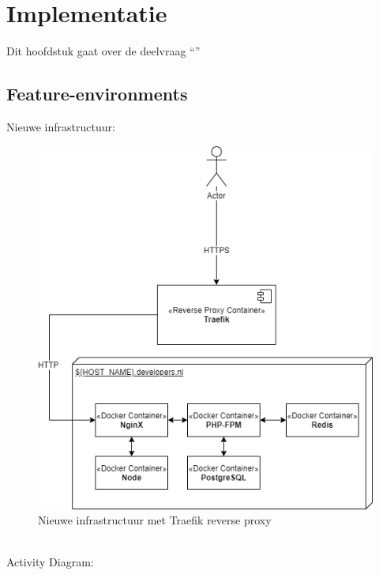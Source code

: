 \chapter{Implementatie}

\label{Chapter6}

Dit hoofdstuk gaat over de deelvraag \enquote{\deelimplementatie}

\section{Feature-environments}
Nieuwe infrastructuur:
\begin{figure}[h]
	\centering
	\includegraphics[width=13cm]{Figures/Traefik}
	\decoRule
	\caption[Traefik Infrastructure]{Nieuwe infrastructuur met Traefik reverse proxy}
	\label{fig:traefikinfrastructure}
\end{figure}
\\Activity Diagram:
